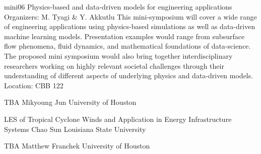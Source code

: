 \mini
{mini06}
{Physics-based and data-driven models for engineering applications}
{Organizers: M. Tyagi \& Y. Akkutlu}
{This mini-symposium will cover a wide range of engineering applications using physics-based simulations as well as data-driven machine learning models. Presentation examples would range from subsurface flow phenomena, fluid dynamics, and mathematical foundations of data-science. The proposed mini symposium would also bring together interdisciplinary researchers working on highly relevant societal challenges through their understanding of different aspects of underlying physics and data-driven models.}
{Location: CBB 122}

\begin{talks}
\item\talk
{TBA}
{Mikyoung Jun}
{University of Houston}
\item\talk
{LES of Tropical Cyclone Winds and Application in Energy Infrastructure Systems}
{Chao Sun}
{Louisiana State University}
\item\talk
{TBA}
{Matthew Franchek}
{University of Houston}
\end{talks}
\room
